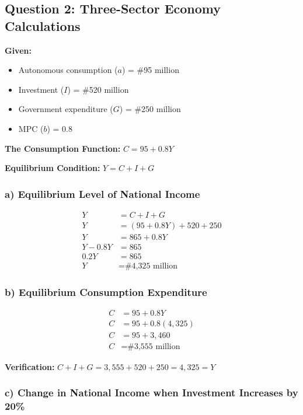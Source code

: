 \documentclass[12pt,a4paper]{article}
\begin{document}

\subsection{Question 2: Three-Sector Economy Calculations}

\textbf{Given:}
\begin{itemize}
    \item Autonomous consumption ($a$) = \#95 million
    \item Investment ($I$) = \#520 million
    \item Government expenditure ($G$) = \#250 million
    \item MPC ($b$) = 0.8
\end{itemize}

\textbf{The Consumption Function:} $C = 95 + 0.8Y$

\textbf{Equilibrium Condition:} $Y = C + I + G$

\subsubsection*{a) Equilibrium Level of National Income}

\begin{align}
Y &= C + I + G \\
Y &= (95 + 0.8Y) + 520 + 250 \\
Y &= 865 + 0.8Y \\
Y - 0.8Y &= 865 \\
0.2Y &= 865 \\
Y &= \text{\#4,325 million}
\end{align}

\subsubsection*{b) Equilibrium Consumption Expenditure}

\begin{align}
C &= 95 + 0.8Y \\
C &= 95 + 0.8(4,325) \\
C &= 95 + 3,460 \\
C &= \text{\#3,555 million}
\end{align}

\textbf{Verification:} $C + I + G = 3,555 + 520 + 250 = 4,325 = Y$ \checkmark

\subsubsection*{c) Change in National Income when Investment Increases by 20\%}
\end{document}

